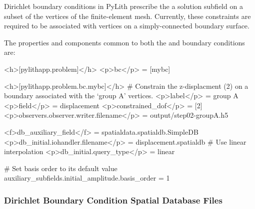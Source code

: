 Dirichlet boundary conditions in PyLith prescribe the a solution
subfield on a subset of the vertices of the finite-element
mesh. Currently, these constraints are required to be associated with
vertices on a simply-connected boundary surface.

The properties and components common to both the  and
 boundary conditions are:
\begin{inventory}
\end{inventory}


\begin{cfg}
<h>[pylithapp.problem]</h>
<p>bc</p> = [mybc]

<h>[pylithapp.problem.bc.mybc]</h>
# Constrain the z-displacment (2) on a boundary associated with the `group A' vertices.
<p>label</p> = group A
<p>field</p> = displacement
<p>constrained_dof</p> = [2]
<p>observers.observer.writer.filename</p> = output/step02-groupA.h5

<f>db_auxiliary_field</f> = spatialdata.spatialdb.SimpleDB
<p>db_initial.iohandler.filename</p> = displacement.spatialdb
# Use linear interpolation
<p>db_initial.query_type</p> = linear

# Set basis order to its default value
auxiliary_subfields.initial_amplitude.basis_order = 1
\end{cfg}

\subsubsection{Dirichlet Boundary Condition Spatial Database Files}

